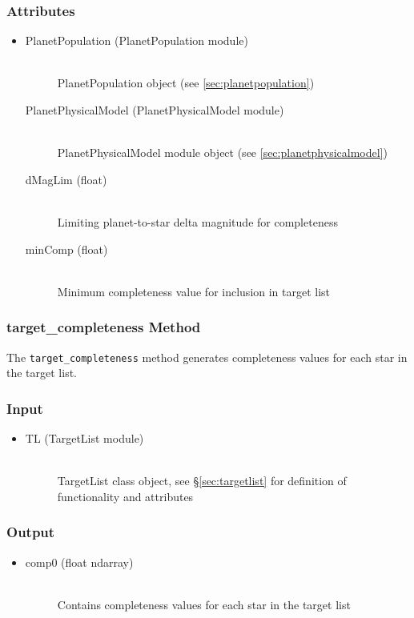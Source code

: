 \documentclass[cleanfoot]{asme2ej}
\begin{document}
\subsubsection*{Attributes}
\begin{itemize}
\item 
\begin{description}
    \item[PlanetPopulation (PlanetPopulation module)] \hfill \\ PlanetPopulation object (see \ref{sec:planetpopulation})
    \item[PlanetPhysicalModel (PlanetPhysicalModel module)] \hfill \\ PlanetPhysicalModel module object (see \ref{sec:planetphysicalmodel}) 
    \item[dMagLim (float)] \hfill \\ Limiting planet-to-star delta magnitude for completeness
    \item[minComp (float)] \hfill \\ Minimum completeness value for inclusion in target list
\end{description}
\end{itemize}

\subsubsection{target\_completeness Method}
\label{sec:targetcompletenesstask}
The \verb+target_completeness+ method generates completeness values for each star in the target list.

\subsubsection*{Input}
\begin{itemize}
\item 
\begin{description}
    \item[TL (TargetList module)] \hfill \\ TargetList class object, see \S\ref{sec:targetlist} for definition of functionality and attributes
\end{description}
\end{itemize}

\subsubsection*{Output}
\begin{itemize}
\item 
\begin{description}
    \item[comp0 (float ndarray)] \hfill \\ Contains completeness values for each star in the target list
\end{description}
\end{itemize}
\end{document}
